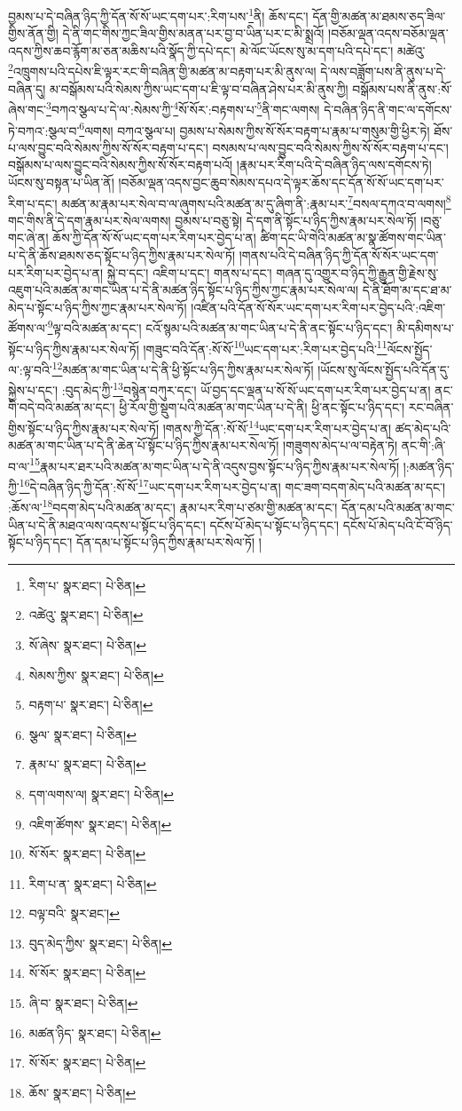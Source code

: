 བྱམས་པ་དེ་བཞིན་ཉིད་ཀྱི་དོན་སོ་སོ་ཡང་དག་པར་:རིག་པས་\footnote{རིག་པ་  སྣར་ཐང་།  པེ་ཅིན། }ནི། ཆོས་དང་། དོན་གྱི་མཚན་མ་ཐམས་ཅད་ཟིལ་གྱིས་ནོན་གྱི། དེ་ནི་གང་གིས་ཀྱང་ཟིལ་གྱིས་མནན་པར་བྱ་བ་ཡིན་པར་ང་མི་སྨྲའོ། །བཅོམ་ལྡན་འདས་བཅོམ་ལྡན་འདས་ཀྱིས་ཆབ་རྙོག་མ་ཅན་མཆིས་པའི་སྣོད་ཀྱི་དཔེ་དང་། མེ་ལོང་ཡོངས་སུ་མ་དག་པའི་དཔེ་དང་། མཚེའུ་\footnote{འཚེའུ་  སྣར་ཐང་།  པེ་ཅིན། }འཁྲུགས་པའི་དཔེས་ཇི་ལྟར་རང་གི་བཞིན་གྱི་མཚན་མ་བརྟག་པར་མི་ནུས་ལ། དེ་ལས་བཟློག་པས་ནི་ནུས་པ་དེ་བཞིན་དུ། མ་བསྒོམས་པའི་སེམས་ཀྱིས་ཡང་དག་པ་ཇི་ལྟ་བ་བཞིན་ཤེས་པར་མི་ནུས་ཀྱི། བསྒོམས་པས་ནི་ནུས་:སོ་ཞེས་གང་\footnote{སོ་ཞེས་  སྣར་ཐང་།  པེ་ཅིན། }བཀའ་སྩལ་པ་དེ་ལ་:སེམས་ཀྱི་\footnote{སེམས་ཀྱིས་  སྣར་ཐང་།  པེ་ཅིན། }སོ་སོར་:བརྟགས་པ་\footnote{བརྟག་པ་  སྣར་ཐང་།  པེ་ཅིན། }ནི་གང་ལགས། དེ་བཞིན་ཉིད་ནི་གང་ལ་དགོངས་ཏེ་བཀའ་:སྩལ་བ་\footnote{སྩལ་  སྣར་ཐང་།  པེ་ཅིན། }ལགས། བཀའ་སྩལ་པ། བྱམས་པ་སེམས་ཀྱིས་སོ་སོར་བརྟག་པ་རྣམ་པ་གསུམ་གྱི་ཕྱིར་ཏེ། ཐོས་པ་ལས་བྱུང་བའི་སེམས་ཀྱིས་སོ་སོར་བརྟག་པ་དང་། བསམས་པ་ལས་བྱུང་བའི་སེམས་ཀྱིས་སོ་སོར་བརྟག་པ་དང་། བསྒོམས་པ་ལས་བྱུང་བའི་སེམས་ཀྱིས་སོ་སོར་བརྟག་པའོ། །རྣམ་པར་རིག་པའི་དེ་བཞིན་ཉིད་ལས་དགོངས་ཏེ། ཡོངས་སུ་བསྟན་པ་ཡིན་ནོ། །བཅོམ་ལྡན་འདས་བྱང་ཆུབ་སེམས་དཔའ་དེ་ལྟར་ཆོས་དང་དོན་སོ་སོ་ཡང་དག་པར་རིག་པ་དང་། མཚན་མ་རྣམ་པར་སེལ་བ་ལ་ཞུགས་པའི་མཚན་མ་དུ་ཞིག་ནི་:རྣམ་པར་\footnote{རྣམ་པ་  སྣར་ཐང་།  པེ་ཅིན། }བསལ་དཀའ་བ་ལགས།\footnote{དག་ལགས་ལ།  སྣར་ཐང་།  པེ་ཅིན། } གང་གིས་ནི་དེ་དག་རྣམ་པར་སེལ་ལགས། བྱམས་པ་བཅུ་སྟེ། དེ་དག་ནི་སྟོང་པ་ཉིད་ཀྱིས་རྣམ་པར་སེལ་ཏོ། །བཅུ་གང་ཞེ་ན། ཆོས་ཀྱི་དོན་སོ་སོ་ཡང་དག་པར་རིག་པར་བྱེད་པ་ན། ཚིག་དང་ཡི་གེའི་མཚན་མ་སྣ་ཚོགས་གང་ཡིན་པ་དེ་ནི་ཆོས་ཐམས་ཅད་སྟོང་པ་ཉིད་ཀྱིས་རྣམ་པར་སེལ་ཏོ། །གནས་པའི་དེ་བཞིན་ཉིད་ཀྱི་དོན་སོ་སོར་ཡང་དག་པར་རིག་པར་བྱེད་པ་ན། སྐྱེ་བ་དང་། འཇིག་པ་དང་། གནས་པ་དང་། གཞན་དུ་འགྱུར་བ་ཉིད་ཀྱི་རྒྱུན་གྱི་རྗེས་སུ་འཇུག་པའི་མཚན་མ་གང་ཡིན་པ་དེ་ནི་མཚན་ཉིད་སྟོང་པ་ཉིད་ཀྱིས་ཀྱང་རྣམ་པར་སེལ་ལ། དེ་ནི་ཐོག་མ་དང་ཐ་མ་མེད་པ་སྟོང་པ་ཉིད་ཀྱིས་ཀྱང་རྣམ་པར་སེལ་ཏོ། །འཛིན་པའི་དོན་སོ་སོར་ཡང་དག་པར་རིག་པར་བྱེད་པའི་:འཇིག་ཚོགས་ལ་\footnote{འཇིག་ཚོགས་  སྣར་ཐང་།  པེ་ཅིན། }ལྟ་བའི་མཚན་མ་དང་། ངའོ་སྙམ་པའི་མཚན་མ་གང་ཡིན་པ་དེ་ནི་ནང་སྟོང་པ་ཉིད་དང་། མི་དམིགས་པ་སྟོང་པ་ཉིད་ཀྱིས་རྣམ་པར་སེལ་ཏོ། །གཟུང་བའི་དོན་:སོ་སོ་\footnote{སོ་སོར་  སྣར་ཐང་།  པེ་ཅིན། }ཡང་དག་པར་:རིག་པར་བྱེད་པའི་\footnote{རིག་པ་ན་  སྣར་ཐང་།  པེ་ཅིན། }ལོངས་སྤྱོད་ལ་:ལྟ་བའི་\footnote{བལྟ་བའི་  སྣར་ཐང་། }མཚན་མ་གང་ཡིན་པ་དེ་ནི་ཕྱི་སྟོང་པ་ཉིད་ཀྱིས་རྣམ་པར་སེལ་ཏོ། །ཡོངས་སུ་ལོངས་སྤྱོད་པའི་དོན་དུ་སྐྱེས་པ་དང་། :བུད་མེད་ཀྱི་\footnote{བུད་མེད་ཀྱིས་  སྣར་ཐང་།  པེ་ཅིན། }བསྙེན་བཀུར་དང་། ཡོ་བྱད་དང་ལྡན་པ་སོ་སོ་ཡང་དག་པར་རིག་པར་བྱེད་པ་ན། ནང་གི་བདེ་བའི་མཚན་མ་དང་། ཕྱི་རོལ་གྱི་སྡུག་པའི་མཚན་མ་གང་ཡིན་པ་དེ་ནི། ཕྱི་ནང་སྟོང་པ་ཉིད་དང་། རང་བཞིན་གྱིས་སྟོང་པ་ཉིད་ཀྱིས་རྣམ་པར་སེལ་ཏོ། །གནས་ཀྱི་དོན་:སོ་སོ་\footnote{སོ་སོར་  སྣར་ཐང་།  པེ་ཅིན། }ཡང་དག་པར་རིག་པར་བྱེད་པ་ན། ཚད་མེད་པའི་མཚན་མ་གང་ཡིན་པ་དེ་ནི་ཆེན་པོ་སྟོང་པ་ཉིད་ཀྱིས་རྣམ་པར་སེལ་ཏོ། །གཟུགས་མེད་པ་ལ་བརྟེན་ཏེ། ནང་གི་:ཞི་བ་ལ་\footnote{ཞི་བ་  སྣར་ཐང་།  པེ་ཅིན། }རྣམ་པར་ཐར་པའི་མཚན་མ་གང་ཡིན་པ་དེ་ནི་འདུས་བྱས་སྟོང་པ་ཉིད་ཀྱིས་རྣམ་པར་སེལ་ཏོ། །:མཚན་ཉིད་ཀྱི་\footnote{མཚན་ཉིད་  སྣར་ཐང་།  པེ་ཅིན། }དེ་བཞིན་ཉིད་ཀྱི་དོན་:སོ་སོ་\footnote{སོ་སོར་  སྣར་ཐང་།  པེ་ཅིན། }ཡང་དག་པར་རིག་པར་བྱེད་པ་ན། གང་ཟག་བདག་མེད་པའི་མཚན་མ་དང་། :ཆོས་ལ་\footnote{ཆོས་  སྣར་ཐང་།  པེ་ཅིན། }བདག་མེད་པའི་མཚན་མ་དང་། རྣམ་པར་རིག་པ་ཙམ་གྱི་མཚན་མ་དང་། དོན་དམ་པའི་མཚན་མ་གང་ཡིན་པ་དེ་ནི་མཐའ་ལས་འདས་པ་སྟོང་པ་ཉིད་དང་། དངོས་པོ་མེད་པ་སྟོང་པ་ཉིད་དང་། དངོས་པོ་མེད་པའི་ངོ་བོ་ཉིད་སྟོང་པ་ཉིད་དང་། དོན་དམ་པ་སྟོང་པ་ཉིད་ཀྱིས་རྣམ་པར་སེལ་ཏོ། །
